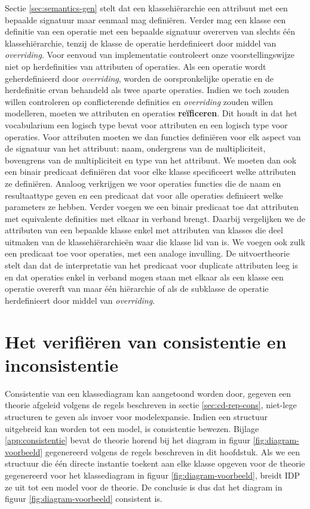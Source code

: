 Sectie \ref{sec:semantics-gen} stelt dat een klassehi\"erarchie een attribuut met een bepaalde signatuur maar eenmaal mag defini\"eren. Verder mag een klasse een definitie van een operatie met een bepaalde signatuur overerven van slechts \'e\'en klassehi\"erarchie, tenzij de klasse de operatie herdefinieert door middel van \textit{overriding}. Voor eenvoud van implementatie controleert onze voorstellingswijze niet op herdefinities van attributen of operaties. Als een operatie wordt geherdefinieerd door \textit{overriding}, worden de oorspronkelijke operatie en de herdefinitie ervan behandeld als twee aparte operaties. Indien we toch zouden willen controleren op conflicterende definities en \textit{overriding} zouden willen modelleren, moeten we attributen en operaties \textbf{re\"ificeren}. Dit houdt in dat het vocabularium een logisch type bevat voor attributen en een logisch type voor operaties. Voor attributen moeten we dan functies defini\"eren voor elk aspect van de signatuur van het attribuut: naam, ondergrens van de multipliciteit, bovengrens van de multipliciteit en type van het attribuut. We moeten dan ook een binair predicaat defini\"eren dat voor elke klasse specificeert welke attributen ze defini\"eren. Analoog verkrijgen we voor operaties functies die de naam en resultaattype geven en een predicaat dat voor alle operaties definieert welke parameters ze hebben. Verder voegen we een binair predicaat toe dat attributen met equivalente definities met elkaar in verband brengt. Daarbij vergelijken we de attributen van een bepaalde klasse enkel met attributen van klasses die deel uitmaken van de klassehi\"erarchie\"en waar die klasse lid van is. We voegen ook zulk een predicaat toe voor operaties, met een analoge invulling. De uitvoertheorie stelt dan dat de interpretatie van het predicaat voor duplicate attributen leeg is en dat operaties enkel in verband mogen staan met elkaar als een klasse een operatie overerft van maar \'e\'en hi\"erarchie of als de subklasse de operatie herdefinieert door middel van \textit{overriding}.

\section{Het verifi\"eren van consistentie en inconsistentie}

Consistentie van een klassediagram kan aangetoond worden door, gegeven een theorie afgeleid volgens de regels beschreven in sectie \ref{sec:cd-rep-cons}, niet-lege structuren te geven als invoer voor modelexpansie. Indien een structuur uitgebreid kan worden tot een model, is consistentie bewezen. Bijlage \ref{app:consistentie} bevat de theorie horend bij het diagram in figuur \ref{fig:diagram-voorbeeld} gegenereerd volgens de regels beschreven in dit hoofdstuk. Als we een structuur die \'e\'en directe instantie toekent aan elke klasse opgeven voor de theorie gegenereerd voor het klassediagram in figuur \ref{fig:diagram-voorbeeld}, breidt IDP ze uit tot een model voor de theorie. De conclusie is dus dat het diagram in figuur \ref{fig:diagram-voorbeeld} consistent is.


